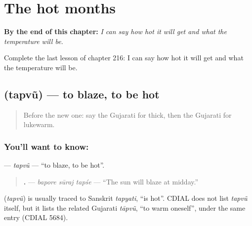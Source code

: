 
\chapter{The hot months}
\label{ch:gu-the-hot-months}

\begin{chapteropening}
\textbf{By the end of this chapter:} \emph{I can say how hot it will get and what the temperature will be.}

Complete the last lesson of chapter 216: I can say how hot it will get and what the temperature will be.
\end{chapteropening}

\section[\texorpdfstring{\gu{તપવું} (tapvũ)}{તપવું (tapvũ)}]{ (tapvũ) — to blaze, to be hot}

\label{lesson:GU-C216-tapvu}



\begin{quote}
Before the new one: say the Gujarati for thick, then the Gujarati for lukewarm.
\end{quote}

\subsection*{You'll want to know: }
\textbf{} — \emph{tapvũ} — \textquotedblleft{}to blaze, to be hot\textquotedblright{}.

\begin{quote}
\textbf{  .} — \emph{bapore sūraj tapśe} — \textquotedblleft{}The sun will blaze at midday.\textquotedblright{}
\end{quote}

\begin{cousinweb}
\textbf{} (\emph{tapvũ}) is usually traced to Sanskrit \emph{tapyati}, \textquotedblleft{}is hot\textquotedblright{}. CDIAL does not list \emph{tapvũ} itself, but it lists the related Gujarati \emph{tāpvũ}, \textquotedblleft{}to warm oneself\textquotedblright{}, under the same entry (CDIAL 5684).
\end{cousinweb}

